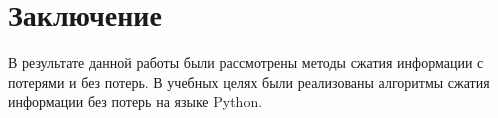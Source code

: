 \section*{Заключение}%
%

В результате данной работы были рассмотрены методы сжатия информации с потерями и без потерь. В учебных целях были реализованы алгоритмы сжатия информации без потерь на языке Python.
